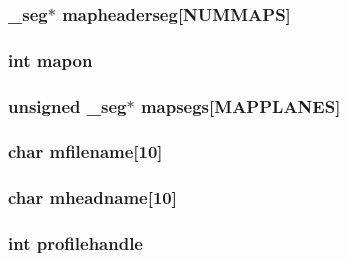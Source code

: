 \label{ID__CA_8H_a9a8af7c3aff26b9be0edd764efef3bba}
\hypertarget{ID__CA_8H_a4fa58ff79559a7ff81611311489c8e70}{
\subsubsection[{mapheaderseg}]{ \_\-seg$\ast$ {\bf mapheaderseg}\mbox{[}NUMMAPS\mbox{]}}}
\label{ID__CA_8H_a4fa58ff79559a7ff81611311489c8e70}
\hypertarget{ID__CA_8H_a9bc2aa6f5318e11111d85d1f526f4ed9}{
\subsubsection[{mapon}]{\setlength{\rightskip}{0pt plus 5cm}int {\bf mapon}}}
\label{ID__CA_8H_a9bc2aa6f5318e11111d85d1f526f4ed9}
\hypertarget{ID__CA_8H_aa491c919acbb7c3a3626dc79014b7b7b}{
\subsubsection[{mapsegs}]{\setlength{\rightskip}{0pt plus 5cm}unsigned \_\-seg$\ast$ {\bf mapsegs}\mbox{[}MAPPLANES\mbox{]}}}
\label{ID__CA_8H_aa491c919acbb7c3a3626dc79014b7b7b}
\hypertarget{ID__CA_8H_aed11d164b12fd19ca11fee978f42673d}{
\subsubsection[{mfilename}]{\setlength{\rightskip}{0pt plus 5cm}char {\bf mfilename}\mbox{[}10\mbox{]}}}
\label{ID__CA_8H_aed11d164b12fd19ca11fee978f42673d}
\hypertarget{ID__CA_8H_ad22a6c11e49c368ace6f3aca1057b21d}{
\subsubsection[{mheadname}]{\setlength{\rightskip}{0pt plus 5cm}char {\bf mheadname}\mbox{[}10\mbox{]}}}
\label{ID__CA_8H_ad22a6c11e49c368ace6f3aca1057b21d}
\hypertarget{ID__CA_8H_ad1a5984b9f9fb82e3d9fdc3e79bdb5d0}{
\subsubsection[{profilehandle}]{\setlength{\rightskip}{0pt plus 5cm}int {\bf profilehandle}}}
